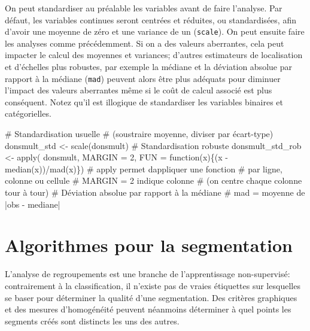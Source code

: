 \documentclass[
  11pt,
  letterpaper,
]{book}
\newenvironment{Shaded}{\begin{snugshade}}{\end{snugshade}}
\newcommand{\AttributeTok}[1]{\textcolor[rgb]{0.40,0.45,0.13}{#1}}
\newcommand{\CommentTok}[1]{\textcolor[rgb]{0.37,0.37,0.37}{#1}}
\newcommand{\ControlFlowTok}[1]{\textcolor[rgb]{0.00,0.23,0.31}{#1}}
\newcommand{\DecValTok}[1]{\textcolor[rgb]{0.68,0.00,0.00}{#1}}
\newcommand{\FunctionTok}[1]{\textcolor[rgb]{0.28,0.35,0.67}{#1}}
\newcommand{\NormalTok}[1]{\textcolor[rgb]{0.00,0.23,0.31}{#1}}
\newcommand{\OtherTok}[1]{\textcolor[rgb]{0.00,0.23,0.31}{#1}}
\newcommand{\SpecialCharTok}[1]{\textcolor[rgb]{0.37,0.37,0.37}{#1}}
\theoremstyle{definition}
\theoremstyle{remark}
\begin{document}
On peut standardiser au préalable les variables avant de faire
l'analyse. Par défaut, les variables continues seront centrées et
réduites, ou standardisées, afin d'avoir une moyenne de zéro et une
variance de un (\texttt{scale}). On peut ensuite faire les analyses
comme précédemment. Si on a des valeurs aberrantes, cela peut impacter
le calcul des moyennes et variances; d'autres estimateurs de
localisation et d'échelles plus robustes, par exemple la médiane et la
déviation absolue par rapport à la médiane (\texttt{mad}) peuvent alors
être plus adéquats pour diminuer l'impact des valeurs aberrantes même si
le coût de calcul associé est plus conséquent. Notez qu'il est illogique
de standardiser les variables binaires et catégorielles.

\begin{Shaded}
\begin{Highlighting}[]
\CommentTok{\# Standardisation usuelle }
\CommentTok{\# (soustraire moyenne, diviser par écart{-}type)}
\NormalTok{donsmult\_std }\OtherTok{\textless{}{-}} \FunctionTok{scale}\NormalTok{(donsmult)}
\CommentTok{\# Standardisation robuste}
\NormalTok{donsmult\_std\_rob }\OtherTok{\textless{}{-}} \FunctionTok{apply}\NormalTok{(}
\NormalTok{  donsmult, }
  \AttributeTok{MARGIN =} \DecValTok{2}\NormalTok{, }
  \AttributeTok{FUN =} \ControlFlowTok{function}\NormalTok{(x)\{(x }\SpecialCharTok{{-}} \FunctionTok{median}\NormalTok{(x))}\SpecialCharTok{/}\FunctionTok{mad}\NormalTok{(x)\})}
\CommentTok{\# apply permet d\textquotesingle{}appliquer une fonction}
\CommentTok{\# par ligne, colonne ou cellule}
\CommentTok{\# MARGIN = 2 indique colonne }
\CommentTok{\# (on centre chaque colonne tour à tour)}
\CommentTok{\# Déviation absolue par rapport à la médiane}
\CommentTok{\# mad = moyenne de |obs {-} mediane|}
\end{Highlighting}
\end{Shaded}

\hypertarget{algorithmes-pour-la-segmentation}{%
\section{Algorithmes pour la
segmentation}\label{algorithmes-pour-la-segmentation}}

L'analyse de regroupements est une branche de l'apprentissage
non-supervisé: contrairement à la classification, il n'existe pas de
vraies étiquettes sur lesquelles se baser pour déterminer la qualité
d'une segmentation. Des critères graphiques et des mesures d'homogénéité
peuvent néanmoins déterminer à quel points les segments créés sont
distincts les uns des autres.
\end{document}
